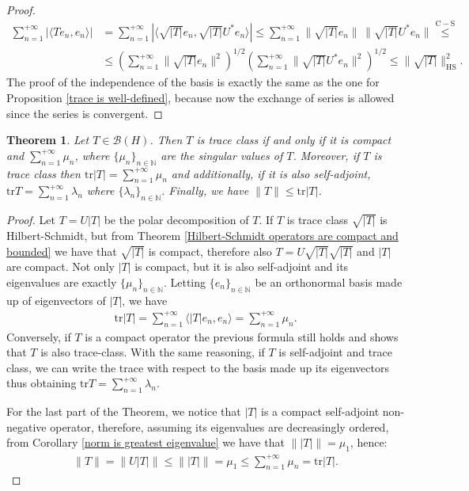 \documentclass[corpo=11pt, stile=classica, tipotesi=custom,
greek, evenboxes, english]{toptesi}
\numberwithin{equation}{chapter}
\newtheorem{teo}{Theorem}[chapter] %
\theoremstyle{remark}
\newcommand{\N}{\mathbb{N}} %
\newcommand{\B}{\mathscr{B}} %
\begin{document}
\begin{proof}
{\begin{align*}
			\sum_{n=1}^{+\infty} |\langle Te_n,e_n  \rangle| &= \sum_{n=1}^{+\infty} |\langle \sqrt{|T|}e_n,\sqrt{|T|}U^*e_n\rangle| \leq \sum_{n=1}^{+\infty} \| \sqrt{|T|}e_n\|\, \|\sqrt{|T|}U^*e_n \| \overset{\mathrm{C-S}}{\leq}\\
			&\leq \left(\sum_{n=1}^{+\infty} \| \sqrt{|T|}e_n\|^2 \right)^{1/2} \left(\sum_{n=1}^{+\infty} \| \sqrt{|T|}U^*e_n\|^2 \right)^{1/2} \leq \|\sqrt{|T|}\|_{\mathrm{HS}}^2.
		\end{align*}
		The proof of the independence of the basis is exactly the same as the one for Proposition \ref{trace is well-defined}, because now the exchange of series is allowed since the series is convergent.}
\end{proof}

\begin{teo}\label{trace class operators are compact and bounded}
	Let $T \in \B(H)$. Then $T$ is trace class if and only if it is compact and $\sum_{n=1}^{+\infty} \mu_n$, where $\{\mu_n\}_{n \in \N}$ are the singular values of $T$. Moreover, if $T$ is trace class then $\mathrm{tr}|T| = \sum_{n=1}^{+\infty} \mu_n$ and additionally, if it is also self-adjoint, $\mathrm{tr}T = \sum_{n=1}^{+\infty} \lambda_n$ where $\{\lambda_n\}_{n \in \N}$. Finally, we have $\|T\| \leq \mathrm{tr}|T|$.
\end{teo}
\begin{proof}
	Let $T = U|T|$ be the polar decomposition of $T$. If $T$ is trace class $\sqrt{|T|}$ is Hilbert-Schmidt, but from Theorem \ref{Hilbert-Schmidt operators are compact and bounded} we have that $\sqrt{|T|}$ is compact, therefore also $T = U \sqrt{|T|}\sqrt{|T|}$ and $|T|$ are compact. Not only $|T|$ is compact, but it is also self-adjoint and its eigenvalues are exactly $\{\mu_n\}_{n \in \N}$. Letting $\{e_n\}_{n \in \N}$ be an orthonormal basis made up of eigenvectors of $|T|$, we have
	\begin{align*}
		\mathrm{tr}|T| = \sum_{n=1}^{+\infty} \langle |T|e_n,e_n \rangle = \sum_{n=1}^{+\infty} \mu_n.
	\end{align*}
	Conversely, if $T$ is a compact operator the previous formula still holds and shows that $T$ is also trace-class. With the same reasoning, if $T$ is self-adjoint and trace class, we can write the trace with respect to the basis made up its eigenvectors thus obtaining $\mathrm{tr}T = \sum_{n=1}^{+\infty} \lambda_n$.
	
	For the last part of the Theorem, we notice that $|T|$ is a compact self-adjoint non-negative operator, therefore, assuming its eigenvalues are decreasingly ordered, from Corollary \ref{norm is greatest eigenvalue} we have that $\| |T| \| = \mu_1$, hence:
	\begin{align*}
		\| T \| = \| U |T| \| \leq \| |T| \| = \mu_1 \leq \sum_{n=1}^{+\infty} \mu_n = \mathrm{tr}|T|.
	\end{align*} 	
\end{proof}
\end{document}
